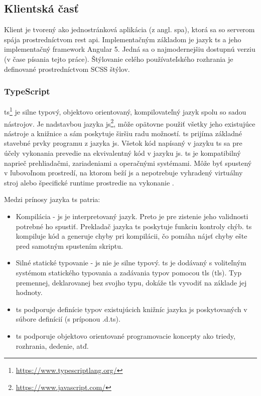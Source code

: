 \subsection{Klientská časť}
\label{subsec:front_end}

Klient je tvorený ako jednostránková aplikácia (z angl. \acrlong{spa}), ktorá sa so serverom spája prostredníctvom 
\acrshort{rest} \acrshort{api}. Implementačným základom je jazyk \acrlong{ts} a jeho implementačný 
framework Angular 5. Jedná sa o najmodernejšiu dostupnú verziu (v čase písania tejto práce).
Štýlovanie celého používateľského rozhrania je definované prostredníctvom SCSS štýlov.

\subsubsection{TypeScript}
\label{subsubsec:typescript}

\acrlong{ts}\footnote{\url{https://www.typescriptlang.org/}}
je silne typový, objektovo orientovaný, kompilovateľný jazyk spolu
so sadou nástrojov. Je nadstavbou jazyka \acrlong{js}\footnote{\url{https://www.javascript.com/}},
môže opätovne použiť
všetky jeho existujúce nástroje a knižnice a sám poskytuje širšiu radu možností. 
\acrlong{ts} prijíma základné stavebné prvky programu z jazyka \acrlong{js}.
Všetok kód napísaný v jazyku \acrlong{ts} sa pre účely vykonania prevedie na
ekvivalentný kód v jazyku \acrlong{js}. \acrshort{ts} je kompatibilný naprieč
prehliadačmi, zariadeniami a operačnými systémami. Môže byť spustený v
ľubovoľnom prostredí, na ktorom beží \acrlong{js} a nepotrebuje vyhradený
virtuálny stroj alebo špecifické runtime prostredie na vykonanie \cite{kubala}.

Medzi prínosy jazyka \acrlong{ts} patria:
\begin{itemize}
\item Kompilácia - \acrlong{js} je interpretovaný jazyk. Preto je pre zistenie jeho
validnosti potrebné ho spustiť. Prekladač jazyka \acrshort{ts} poskytuje funkciu
 kontroly chýb. \acrshort{ts} kompiluje kód a generuje chyby pri kompilácii,
čo pomáha nájsť chyby ešte pred samotným spustením skriptu.
\item Silné statické typovanie - \acrlong{js} nie je silne typový. \acrlong{ts} je
dodávaný s voliteľným systémom statického typovania a zadávania typov
pomocou \acrshort{tls} (\acrlong{tls}). Typ premennej, deklarovanej
bez svojho typu, dokáže \acrshort{tls} vyvodiť na základe jej hodnoty.
\item \acrlong{ts} podporuje definície typov existujúcich knižníc jazyka \acrlong{js}
poskytovaných v súbore definícií (s príponou .d.ts).
\item \acrlong{ts} podporuje objektovo orientované programovacie koncepty ako
triedy, rozhrania, dedenie, atď.
\end{itemize}

